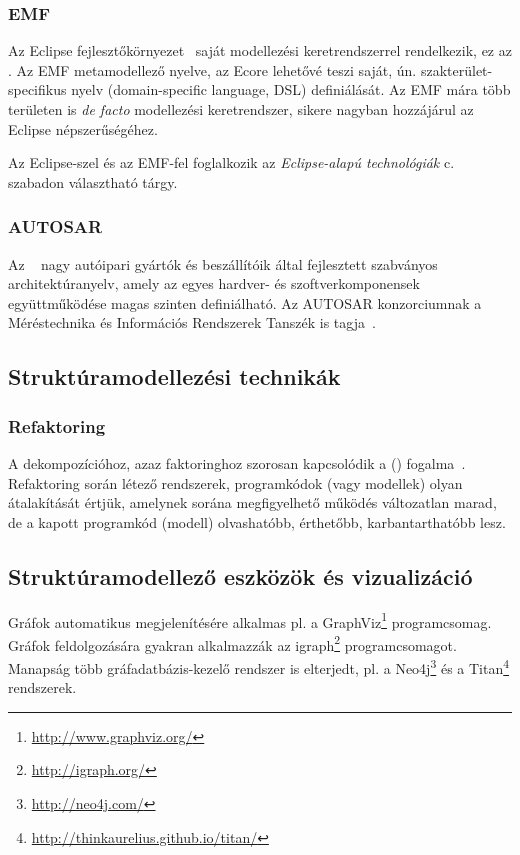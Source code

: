 \subsubsection{EMF}

Az Eclipse fejlesztőkörnyezet~\cite{eclipse} saját modellezési keretrendszerrel rendelkezik, ez az . Az EMF metamodellező nyelve, az Ecore lehetővé teszi saját, ún. szakterület-specifikus nyelv (domain-specific language, DSL) definiálását. Az EMF mára több területen is \emph{de facto} modellezési keretrendszer, sikere nagyban hozzájárul az Eclipse népszerűségéhez.

Az Eclipse-szel és az EMF-fel foglalkozik az \emph{Eclipse-alapú technológiák} c. szabadon választható tárgy.

\subsubsection{AUTOSAR}

Az ~\cite{autosar} nagy autóipari gyártók és beszállítóik által fejlesztett szabványos architektúranyelv, amely az egyes hardver- és szoftverkomponensek együttműködése magas szinten definiálható. Az AUTOSAR konzorciumnak a Méréstechnika és Információs Rendszerek Tanszék is tagja~\cite{autosar-attendees}.

\subsection{Struktúramodellezési technikák}

\subsubsection{Refaktoring}

A dekompozícióhoz, azaz faktoringhoz szorosan kapcsolódik a  () fogalma~\cite{fowler2012refactoring}. Refaktoring során létező rendszerek, programkódok (vagy modellek) olyan átalakítását értjük, amelynek sorána megfigyelhető működés változatlan marad, de a kapott programkód (modell) olvashatóbb, érthetőbb, karbantarthatóbb lesz.

\subsection{Struktúramodellező eszközök és vizualizáció}

Gráfok automatikus megjelenítésére alkalmas pl. a GraphViz\footnote{\url{http://www.graphviz.org/}} programcsomag. Gráfok feldolgozására gyakran alkalmazzák az igraph\footnote{\url{http://igraph.org/}} programcsomagot. Manapság több gráfadatbázis-kezelő rendszer is elterjedt, pl. a Neo4j\footnote{\url{http://neo4j.com/}} és a Titan\footnote{\url{http://thinkaurelius.github.io/titan/}} rendszerek.


